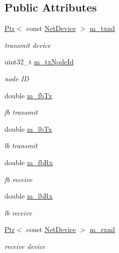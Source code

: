 \subsection*{Public Attributes}
\begin{DoxyCompactItemize}
\item 
\hyperlink{classns3_1_1Ptr}{Ptr}$<$ const \hyperlink{classns3_1_1NetDevice}{Net\+Device} $>$ \hyperlink{classns3_1_1AnimationInterface_1_1AnimPacketInfo_a8076863a20bce78ea2085a3196d3de0d}{m\+\_\+txnd}
\begin{DoxyCompactList}\small\item\em transmit device \end{DoxyCompactList}\item 
uint32\+\_\+t \hyperlink{classns3_1_1AnimationInterface_1_1AnimPacketInfo_aebde6b88dae741a09abe17cd26174fea}{m\+\_\+tx\+Node\+Id}
\begin{DoxyCompactList}\small\item\em node ID \end{DoxyCompactList}\item 
double \hyperlink{classns3_1_1AnimationInterface_1_1AnimPacketInfo_a36cd07b0281a2f7318714ad9f99ee908}{m\+\_\+fb\+Tx}
\begin{DoxyCompactList}\small\item\em fb transmit \end{DoxyCompactList}\item 
double \hyperlink{classns3_1_1AnimationInterface_1_1AnimPacketInfo_a0066f98732431158265804e27dfa2cf2}{m\+\_\+lb\+Tx}
\begin{DoxyCompactList}\small\item\em lb transmit \end{DoxyCompactList}\item 
double \hyperlink{classns3_1_1AnimationInterface_1_1AnimPacketInfo_a616697a7118e5d546155a7117ef15545}{m\+\_\+fb\+Rx}
\begin{DoxyCompactList}\small\item\em fb receive \end{DoxyCompactList}\item 
double \hyperlink{classns3_1_1AnimationInterface_1_1AnimPacketInfo_a6b1ceebc08b438367f226d802da34cc8}{m\+\_\+lb\+Rx}
\begin{DoxyCompactList}\small\item\em lb receive \end{DoxyCompactList}\item 
\hyperlink{classns3_1_1Ptr}{Ptr}$<$ const \hyperlink{classns3_1_1NetDevice}{Net\+Device} $>$ \hyperlink{classns3_1_1AnimationInterface_1_1AnimPacketInfo_ab191a48aaf2b4232476f9c99eda73de7}{m\+\_\+rxnd}
\begin{DoxyCompactList}\small\item\em receive device \end{DoxyCompactList}\end{DoxyCompactItemize}


